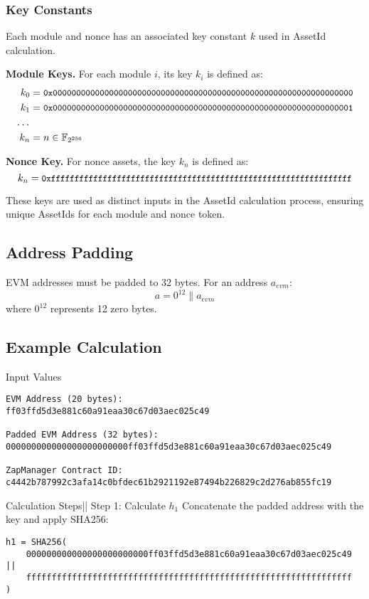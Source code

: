 \subsubsection{Key Constants}
Each module and nonce has an associated key constant $k$ used in AssetId calculation.

\textbf{Module Keys.} For each module $i$, its key $k_i$ is defined as:
\begin{align*}
k_0 &= \small{\texttt{0x0000000000000000000000000000000000000000000000000000000000000000}} \\
k_1 &= \small{\texttt{0x0000000000000000000000000000000000000000000000000000000000000001}} \\
\small{\texttt{...}} \\
k_n &= n \in \mathbb{F}_{2^{256}}
\end{align*}

\textbf{Nonce Key.} For nonce assets, the key $k_n$ is defined as:
\[ k_n = \small{\texttt{0xffffffffffffffffffffffffffffffffffffffffffffffffffffffffffffffff}} \]

These keys are used as distinct inputs in the AssetId calculation process, ensuring unique AssetIds for each module and nonce token.



\subsection{Address Padding}
EVM addresses must be padded to 32 bytes. For an address $a_{evm}$:
\[ a = 0^{12} \parallel a_{evm} \]
where $0^{12}$ represents 12 zero bytes.


\subsection{Example Calculation}
Input Values
\begin{Verbatim}
EVM Address (20 bytes):
ff03ffd5d3e881c60a91eaa30c67d03aec025c49

Padded EVM Address (32 bytes):
000000000000000000000000ff03ffd5d3e881c60a91eaa30c67d03aec025c49

ZapManager Contract ID:
c4442b787992c3afa14c0bfdec61b2921192e87494b226829c2d276ab855fc19
\end{Verbatim}

Calculation Steps||
Step 1: Calculate $h_1$
Concatenate the padded address with the key and apply SHA256:
\begin{Verbatim}
h1 = SHA256(
    000000000000000000000000ff03ffd5d3e881c60a91eaa30c67d03aec025c49 ||
    ffffffffffffffffffffffffffffffffffffffffffffffffffffffffffffffff
)
\end{Verbatim}

